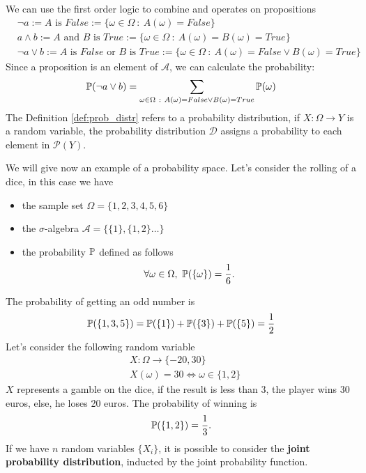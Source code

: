\documentclass[10pt, letterpaper]{report}
\begin{document}
We can use the first order logic to combine and operates on propositions\begin{align}
    &\lnot a := A \text{ is } False := \{\omega\in\Omega \ : \ A(\omega)=False\}\\
    &a\land b := A \text{ and } B \text{ is } True :=\{\omega\in\Omega \ : \ A(\omega)=B(\omega)=True\}\\
    &\lnot a\lor b := A \text{ is }False\text{ or } B \text{ is } True :=\{\omega\in\Omega \ : \ A(\omega)=False\lor B(\omega)=True\}
\end{align}
Since a proposition is an element of $\mathcal A$, we can calculate the probability:\begin{equation}
    \Prob(\lnot a\lor b)=\sum_{\omega\in\Omega \ : \ A(\omega)=False\lor B(\omega)=True}\Prob(\omega)
\end{equation}
The Definition \ref{def:prob_distr} refers to a probability distribution, if $X:\Omega\rightarrow Y$ is a random variable, the probability distribution $\mathcal D$ assigns a probability to each element in $\mathcal P(Y)$.\bigskip

We will give now an example of a probability space. Let's consider the rolling of a dice, in this case we have\begin{itemize}
    \item the sample set $\Omega=\{1,2,3,4,5,6\}$
    \item the $\sigma$-algebra $\mathcal A = \{\{1\},\{1,2\}\dots\}$
    \item the probability ${\mathbb P}$ defined as follows\begin{equation}
        \forall\omega\in \Omega, \ \Prob(\{\omega\})=\frac{1}{6}.
    \end{equation}
\end{itemize}
The probability of getting an odd number is\begin{equation}
    {\mathbb P}(\{1,3,5\})={\mathbb P}(\{1\})+{\mathbb P}(\{3\})+{\mathbb P}(\{5\})=\frac{1}{2}
\end{equation}
Let's consider the following random variable\begin{align}
    &X:\Omega\rightarrow\{-20,30\}\\
    &X(\omega)=30\iff\omega\in\{1,2\} 
\end{align}
$X$ represents a gamble on the dice, if the result is less than 3, the player wins 30 euros, else, he loses 20 euros. The probability of winning is\begin{equation}
    {\mathbb P}(\{1,2\})=\frac{1}{3}.
\end{equation}
If we have $n$ random variables $\{X_i\}$, it is possible to consider the \textbf{joint probability distribution}, inducted by the joint probability function.
\end{document}
